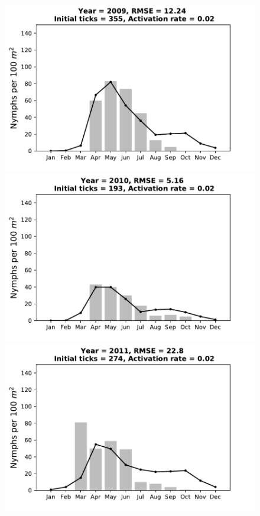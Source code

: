 \documentclass[a4paper, 11pt]{scrartcl}
\begin{document}
\begin{figure}[h!]
\centering
\begin{minipage}[c]{0.40\linewidth}
\includegraphics[width=\linewidth]{figures/s1/s1_2009}
\end{minipage}
\begin{minipage}[c]{0.40\linewidth}
\includegraphics[width=\linewidth]{figures/s1/s1_2010}
\end{minipage}
\begin{minipage}[c]{0.40\linewidth}
\includegraphics[width=\linewidth]{figures/s1/s1_2011}

\end{minipage}
\end{figure}
\end{document}
